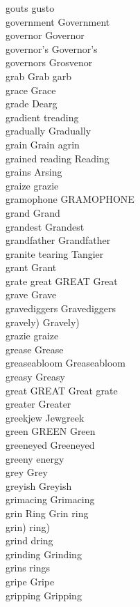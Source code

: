 gouts gusto\\
government Government\\
governor Governor\\
governor's Governor's\\
governors Grosvenor\\
grab Grab garb\\
grace Grace\\
grade Dearg\\
gradient treading\\
gradually Gradually\\
grain Grain agrin\\
grained reading Reading\\
grains Arsing\\
graize grazie\\
gramophone GRAMOPHONE\\
grand Grand\\
grandest Grandest\\
grandfather Grandfather\\
granite tearing Tangier\\
grant Grant\\
grate great GREAT Great\\
grave Grave\\
gravediggers Gravediggers\\
gravely) Gravely)\\
grazie graize\\
grease Grease\\
greaseabloom Greaseabloom\\
greasy Greasy\\
great GREAT Great grate\\
greater Greater\\
greekjew Jewgreek\\
green GREEN Green\\
greeneyed Greeneyed\\
greeny energy\\
grey Grey\\
greyish Greyish\\
grimacing Grimacing\\
grin Ring Grin ring\\
grin) ring)\\
grind dring\\
grinding Grinding\\
grins rings\\
gripe Gripe\\
gripping Gripping\\
